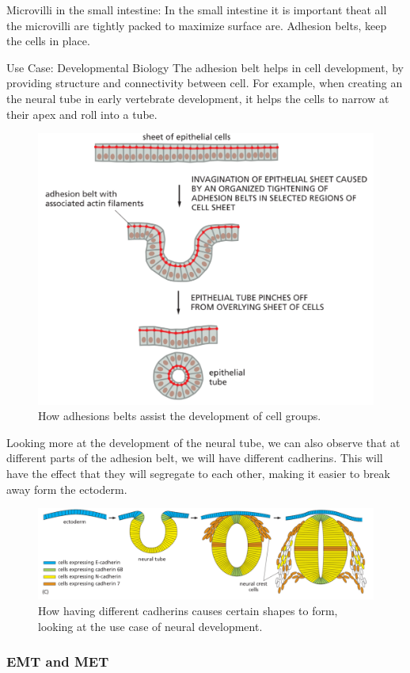 \documentclass[../main.tex]{subfiles}
\begin{document}
\begin{RemarkWithTitel}{Microvilli in the small intestine:}
	In the small intestine it is important theat all the microvilli are tightly packed to maximize surface are. Adhesion belts, keep the cells in place.
\end{RemarkWithTitel}

\begin{RemarkWithTitel}{Use Case: Developmental Biology}
	The adhesion belt helps in cell development, by providing structure and connectivity between cell. For example, when creating an the neural tube in early vertebrate development, it helps the cells to narrow at their apex and roll into a tube.
	
	\begin{figure}[H]
		\centering
		\includegraphics[width=0.4\linewidth]{cad_deve}
		\caption{How adhesions belts assist the development of cell groups.}
		\label{fig:caddeve}
	\end{figure}
	
	Looking more at the development of the neural tube, we can also observe that at different parts of the adhesion belt, we will have different cadherins. This will have the effect that they will segregate to each other, making it easier to break away form the \gls{ectoderm}.
	
	\begin{figure}[H]
		\centering
		\includegraphics[width=0.7\linewidth]{cad_neur}
		\caption{How having different cadherins causes certain shapes to form, looking at the use case of neural development.}
		\label{fig:cadneur}
	\end{figure}
	
\end{RemarkWithTitel}

\subsubsection{EMT and MET}
\end{document}
